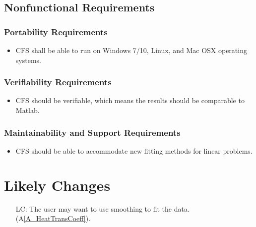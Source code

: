 \documentclass[12pt]{article}
\newcommand{\aref}[1]{A\ref{#1}}
\newcounter{lcnum} %
\newcommand{\famname}{CFS} %
\begin{document}

\subsection{Nonfunctional Requirements}

\subsubsection{Portability Requirements}
\begin{itemize}
	\item \famname{} shall be able to run on Windows 7/10, Linux, and Mac OSX
	operating systems.
\end{itemize}

\subsubsection{Verifiability Requirements}
\begin{itemize}
	\item \famname{} should be verifiable, which means the results should be
          comparable to Matlab. 
\end{itemize}

\subsubsection{Maintainability and Support Requirements}
\begin{itemize}
	\item \famname{} should be able to accommodate new fitting methods for
          linear problems. 
\end{itemize}	
	


\section{Likely Changes}    

\noindent \begin{itemize}

\item[LC\refstepcounter{lcnum}\thelcnum\label{LC_Smoothing}:]The
user may want to use smoothing to fit the data.(\aref{A_HeatTransCoeff}). 

\end{itemize}
\end{document}
